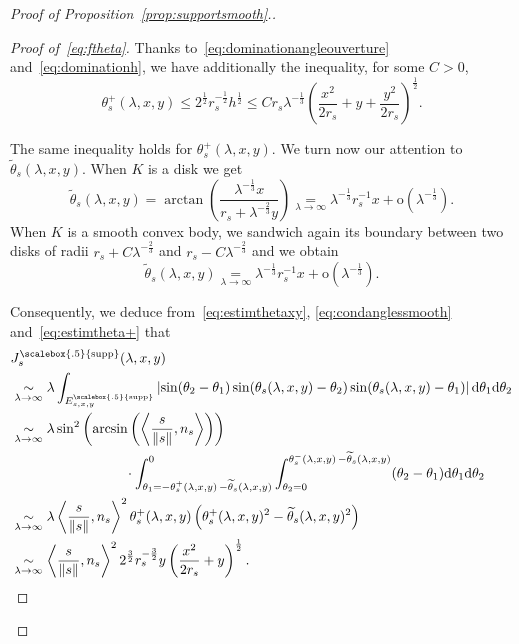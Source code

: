 \documentclass[10pt]{amsart}
\theoremstyle{definition}\newtheorem{defi}[theo]{Definition}\newtheorem{rema}[theo]{Remark}\newtheorem{exam}[theo]{Example}\newtheorem{exem}[theo]{Example}\newtheorem{nota}[theo]{Notation}
\newcommand{\dd}{\mathrm{d}}
\newcommand{\od}{\mathrm{o}}
\DeclareMathOperator{\supp}{\scalebox{.5}{supp}}
\newcommand{\noi}{\noindent}
\newenvironment*{prooff}{\begin{proof}}{\let\qed\relax\end{proof}}
\begin{document}
\begin{proof}[{Proof of Proposition~\ref{prop:supportsmooth}.}]
\begin{prooff}[{Proof of~\eqref{eq:ftheta}}]
Thanks to~\eqref{eq:dominationangleouverture} and~\eqref{eq:dominationh}, we have additionally the inequality, for some $C>0$,
\begin{equation}\label{eq:dominationtheta+}
\theta_s^+(\lambda,x,y)\le 2^{\frac1{2}}r_s^{-\frac1{2}}h^{\frac1{2}}\le C r_s\lambda^{-\frac1{3}}\left(\frac{x^2}{2r_s}+y+\frac{y^2}{2r_s}\right)^{\frac1{2}}.
\end{equation}

The same inequality holds for $\theta_s^+(\lambda,x,y)$. We turn now our attention to $\widetilde{\theta}_s(\lambda,x,y)$. When $K$ is a disk we get
\[
\widetilde{\theta}_s(\lambda,x,y)=\arctan\left(\frac{\lambda^{-\frac1{3}}x}{r_s+\lambda^{-\frac{2}{3}}y}\right)
\underset{\lambda\to\infty}{=}\lambda^{-\frac1{3}}r_s^{-1}x+ \od\left(\lambda^{-\frac13}\right).
\]
When $K$ is a smooth convex body, we sandwich again its boundary between two disks of radii $r_s+C\lambda^{-\frac{2}{3}}$ and $r_s-C\lambda^{-\frac{2}{3}}$ and we obtain
\begin{equation*}\label{eq:estimtildetheta}
\widetilde{\theta}_s(\lambda,x,y)\underset{\lambda\to\infty}{=}\lambda^{-\frac1{3}}r_s^{-1}x+\od\left(\lambda^{-\frac13}\right).
\end{equation*}

Consequently, we deduce from~\eqref{eq:estimthetaxy}, \eqref{eq:condanglessmooth} and~\eqref{eq:estimtheta+} that
\begin{align}
&J^{\supp}_{s}(\lambda,x,y)\nonumber\\
& \underset{\lambda\to\infty}{\sim} \lambda\int_{E^{\supp}_{s,x,y}}\left|\sin(\theta_2-\theta_1)\sin(\theta_s(\lambda,x,y)-\theta_2)\sin(\theta_s(\lambda,x,y)-\theta_1)\right|
\dd \theta_1\dd \theta_2\nonumber \\
& \underset{\lambda\to\infty}{\sim}\lambda\sin^2\left(\arcsin\left(\left\langle\frac{s}{\|s\|},n_s\right\rangle\right)\right)\nonumber\\
&\mkern150mu \cdot \int_{\theta_1=-\theta_s^+(\lambda,x,y)\,-\widetilde{\theta}_s(\lambda,x,y)}^{0}
\int_{\theta_2=0}^{\theta_s^-(\lambda,x,y)\,-\widetilde{\theta}_s(\lambda,x,y)} (\theta_2-\theta_1)\dd \theta_1 \dd\theta_2\nonumber\\
& \underset{\lambda\to\infty}{\sim} \lambda \left\langle \frac{s}{\|s\|},n_s\right\rangle^2 \theta_s^+(\lambda,x,y)\left(\theta_s^+(\lambda,x,y)^2-\widetilde{\theta}_s(\lambda,x,y)^2\right)\nonumber\\
& \underset{\lambda\to\infty}{\sim} \left\langle \frac{s}{\|s\|},n_s\right\rangle^2 2^{\frac{3}{2}}r_s^{-\frac{3}{2}}y\left(\frac{x^2}{2r_s}+y\right)^{\frac1{2}}\label{eq:intangles}.
\end{align}



\end{prooff}
\end{proof}
\end{document}
